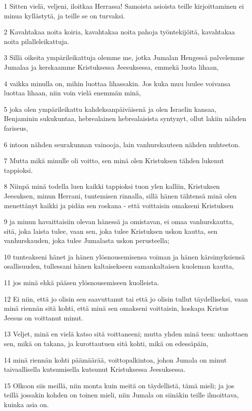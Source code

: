 \par 1 Sitten vielä, veljeni, iloitkaa Herrassa! Samoista asioista teille kirjoittaminen ei minua kyllästytä, ja teille se on turvaksi.
\par 2 Kavahtakaa noita koiria, kavahtakaa noita pahoja työntekijöitä, kavahtakaa noita pilalleleikattuja.
\par 3 Sillä oikeita ympärileikattuja olemme me, jotka Jumalan Hengessä palvelemme Jumalaa ja kerskaamme Kristuksessa Jeesuksessa, emmekä luota lihaan,
\par 4 vaikka minulla on, mihin luottaa lihassakin. Jos kuka muu luulee voivansa luottaa lihaan, niin voin vielä enemmän minä,
\par 5 joka olen ympärileikattu kahdeksanpäiväisenä ja olen Israelin kansaa, Benjaminin sukukuntaa, hebrealainen hebrealaisista syntynyt, ollut lakiin nähden fariseus,
\par 6 intoon nähden seurakunnan vainooja, lain vanhurskauteen nähden nuhteeton.
\par 7 Mutta mikä minulle oli voitto, sen minä olen Kristuksen tähden lukenut tappioksi.
\par 8 Niinpä minä todella luen kaikki tappioksi tuon ylen kalliin, Kristuksen Jeesuksen, minun Herrani, tuntemisen rinnalla, sillä hänen tähtensä minä olen menettänyt kaikki ja pidän sen roskana - että voittaisin omakseni Kristuksen
\par 9 ja minun havaittaisiin olevan hänessä ja omistavan, ei omaa vanhurskautta, sitä, joka laista tulee, vaan sen, joka tulee Kristuksen uskon kautta, sen vanhurskauden, joka tulee Jumalasta uskon perusteella;
\par 10 tunteakseni hänet ja hänen ylösnousemisensa voiman ja hänen kärsimyksiensä osallisuuden, tullessani hänen kaltaisekseen samankaltaisen kuoleman kautta,
\par 11 jos minä ehkä pääsen ylösnousemiseen kuolleista.
\par 12 Ei niin, että jo olisin sen saavuttanut tai että jo olisin tullut täydelliseksi, vaan minä riennän sitä kohti, että minä sen omakseni voittaisin, koskapa Kristus Jeesus on voittanut minut.
\par 13 Veljet, minä en vielä katso sitä voittaneeni; mutta yhden minä teen: unhottaen sen, mikä on takana, ja kurottautuen sitä kohti, mikä on edessäpäin,
\par 14 minä riennän kohti päämäärää, voittopalkintoa, johon Jumala on minut taivaallisella kutsumisella kutsunut Kristuksessa Jeesuksessa.
\par 15 Olkoon siis meillä, niin monta kuin meitä on täydellistä, tämä mieli; ja jos teillä jossakin kohden on toinen mieli, niin Jumala on siinäkin teille ilmoittava, kuinka asia on.
